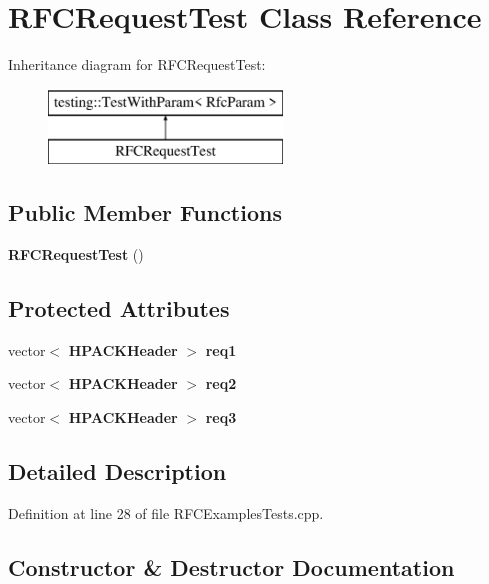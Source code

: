 \section{R\+F\+C\+Request\+Test Class Reference}
\label{classRFCRequestTest}
Inheritance diagram for R\+F\+C\+Request\+Test\+:\begin{figure}[H]
\begin{center}
\leavevmode
\includegraphics[height=2.000000cm]{classRFCRequestTest}
\end{center}
\end{figure}
\subsection*{Public Member Functions}
\begin{DoxyCompactItemize}
\item 
{\bf R\+F\+C\+Request\+Test} ()
\end{DoxyCompactItemize}
\subsection*{Protected Attributes}
\begin{DoxyCompactItemize}
\item 
vector$<$ {\bf H\+P\+A\+C\+K\+Header} $>$ {\bf req1}
\item 
vector$<$ {\bf H\+P\+A\+C\+K\+Header} $>$ {\bf req2}
\item 
vector$<$ {\bf H\+P\+A\+C\+K\+Header} $>$ {\bf req3}
\end{DoxyCompactItemize}


\subsection{Detailed Description}


Definition at line 28 of file R\+F\+C\+Examples\+Tests.\+cpp.



\subsection{Constructor \& Destructor Documentation}
